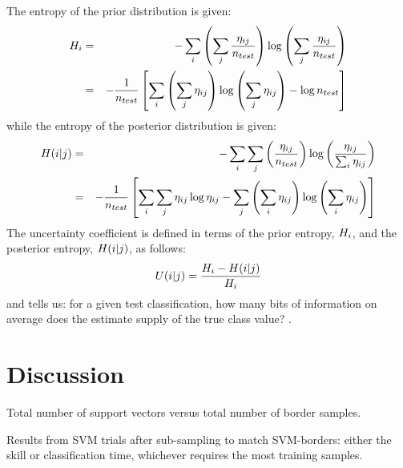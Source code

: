 The entropy of the prior distribution is given:
\begin{eqnarray}
	H_i & = & - \sum_i \left (\sum_j \frac{\eta_{ij}}{n_{test}} \right ) 
	\log \left (\sum_j \frac{\eta_{ij}}{n_{test}} \right )\\
	& = & - \frac{1}{n_{test}} \left [\sum_i \left (\sum_j \eta_{ij} \right ) 
	\log \left (\sum_j \eta_{ij} \right )
	- \log n_{test} \right ]
	\label{prior_entropy}
\end{eqnarray}
while the entropy of the posterior distribution is given:
\begin{eqnarray}
	H(i|j) & = & - \sum_i \sum_j \left ( \frac{\eta_{ij}}{n_{test}} \right ) \log \left (\frac{\eta_{ij}}{\sum_i \eta_{ij}} \right )
	\label{posterior_entropy} \\
	& = & - \frac{1}{n_{test}} \left [ \sum_i \sum_j \eta_{ij} \log \eta_{ij} 
- \sum_j \left ( \sum_i \eta_{ij} \right ) \log \left ( \sum_i \eta_{ij} \right ) \right ]
\end{eqnarray}
The uncertainty coefficient is defined in terms of the prior entropy, $H_i$, and the
posterior entropy, $H(i|j)$, as follows:
\begin{equation}
	U(i|j) = \frac{H_i - H(i|j)}{H_i}
	\label{uncertainty_coefficient}
\end{equation}
and tells us: 
for a given test classification, how many bits of information 
on average does the estimate
supply of the true class value? \citep{Press_etal1992, Mills2011}.

\section{Discussion}

\label{discussion}

\begin{table}
	\caption{Total number of support vectors versus total number of border samples.}
	
	\label{sum_nsv}
\end{table}

\begin{table}
  \caption{Results from SVM trials after sub-sampling to match SVM-borders:
	  either the skill or classification time, whichever requires the most
  training samples.}
  \label{subsampling_table}
  {\small
    
  }
\end{table}

